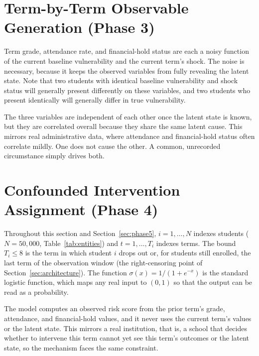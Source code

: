 \documentclass[11pt]{article}
\begin{document}
\section{Term-by-Term Observable Generation (Phase 3)}
\label{sec:phase3}

\hspace*{\parindent}Term grade, attendance rate, and financial-hold status are each a noisy function of the current baseline vulnerability and the current term's shock. The noise is necessary, because it keeps the observed variables from fully revealing the latent state. Note that two students with identical baseline vulnerability and shock status will generally present differently on these variables, and two students who present identically will generally differ in true vulnerability.

The three variables are independent of each other once the latent state is known, but they are correlated overall because they share the same latent cause. This mirrors real administrative data, where attendance and financial-hold status often correlate mildly. One does not cause the other. A common, unrecorded circumstance simply drives both.

\FloatBarrier
\section{Confounded Intervention Assignment (Phase 4)}
\label{sec:phase4}

\hspace*{\parindent}Throughout this section and Section~\ref{sec:phase5}, $i = 1,\ldots,N$ indexes students ($N=50{,}000$, Table~\ref{tab:entities}) and $t = 1,\ldots,T_i$ indexes terms. The bound $T_i \le 8$ is the term in which student $i$ drops out or, for students still enrolled, the last term of the observation window (the right-censoring point of Section~\ref{sec:architecture}). The function $\sigma(x) = 1/(1+e^{-x})$ is the standard logistic function, which maps any real input to $(0,1)$ so that the output can be read as a probability.

The model computes an observed risk score from the prior term's grade, attendance, and financial-hold values, and it never uses the current term's values or the latent state. This mirrors a real institution, that is, a school that decides whether to intervene this term cannot yet see this term's outcomes or the latent state, so the mechanism faces the same constraint.
\end{document}
